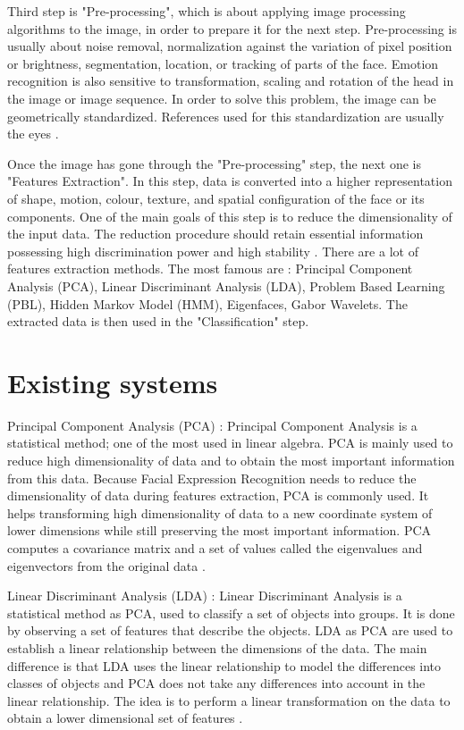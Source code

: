 \noindent Third step is "Pre-processing", which is about applying  image processing algorithms to the image, in order to prepare it for the next step. Pre-processing is usually about noise removal, normalization against the variation of pixel position or brightness, segmentation, location, or tracking of parts of the face. Emotion recognition is also sensitive to transformation, scaling and rotation of the head in the image or image sequence. In order to solve this problem, the image can be geometrically standardized. References used for this standardization are usually the eyes \cite{CHI03}.
\newline

\noindent Once the image has gone through the "Pre-processing" step, the next one is "Features Extraction". In this step, data is converted into a higher representation of shape, motion, colour, texture, and spatial configuration of the face or its components. One of the main goals of this step is to reduce the dimensionality of the input data. The reduction procedure should retain essential information possessing high discrimination power and high stability \cite{CHI03}. There are a lot of features extraction methods. The most famous are : Principal Component Analysis (PCA), Linear Discriminant Analysis (LDA), Problem Based Learning (PBL), Hidden Markov Model (HMM), Eigenfaces, Gabor Wavelets. The extracted data is then used in the "Classification" step.
\newline

\section{Existing systems}

\noindent Principal Component Analysis (PCA) : Principal Component Analysis is a statistical method; one of the most used in linear algebra. PCA is mainly used to reduce high dimensionality of data and to obtain the most important information from this data. Because Facial Expression Recognition needs to reduce the dimensionality of data during features extraction, PCA is commonly used. It helps transforming high dimensionality of data to a new coordinate system of lower dimensions while still preserving the most important information. PCA computes a covariance matrix and a set of values called the eigenvalues and eigenvectors from the original data \cite{GAN08}.
\newline

\noindent Linear Discriminant Analysis (LDA) : Linear Discriminant Analysis is a statistical method as PCA, used to classify a set of objects into groups. It is done by observing a set of features that describe the objects. LDA as PCA are used to establish a linear relationship between the dimensions of the data. The main difference is that LDA uses the linear relationship to model the differences into classes of objects and PCA does not take any differences into account in the linear relationship. The idea is to perform a linear transformation on the data to obtain a lower dimensional set of features \cite{GAN08}.
\newline

